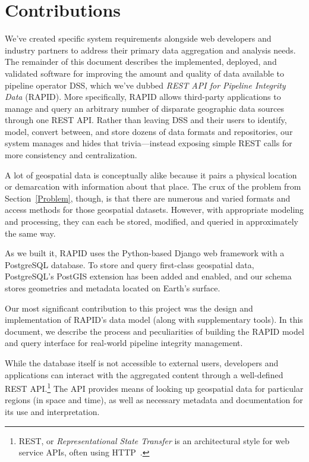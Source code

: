 \section{Contributions}
We've created specific system requirements alongside web developers and industry partners to address their primary data aggregation and analysis needs. The remainder of this document describes the implemented, deployed, and validated software for improving the amount and quality of data available to pipeline operator DSS, which we've dubbed \textit{REST API for Pipeline Integrity Data} (RAPID). More specifically, RAPID allows third-party applications to manage and query an arbitrary number of disparate geographic data sources through one REST API. Rather than leaving DSS and their users to identify, model, convert between, and store dozens of data formats and repositories, our system manages and hides that trivia---instead exposing simple REST calls for more consistency and centralization.

A lot of geospatial data is conceptually alike because it pairs a physical location or demarcation with information about that place. The crux of the problem from Section~\ref{Problem}, though, is that there are numerous and varied formats and access methods for those geospatial datasets. However, with appropriate modeling and processing, they can each be stored, modified, and queried in approximately the same way.

As we built it, RAPID uses the Python-based Django web framework with a PostgreSQL database. To store and query first-class geospatial data, PostgreSQL's PostGIS extension has been added and enabled, and our schema stores geometries and metadata located on Earth's surface.

Our most significant contribution to this project was the design and implementation of RAPID's data model (along with supplementary tools). In this document, we describe the process and peculiarities of building the RAPID model and query interface for real-world pipeline integrity management.

While the database itself is not accessible to external users, developers and applications can interact with the aggregated content through a well-defined REST API.\footnote{REST, or \textit{Representational State Transfer} is an architectural style for web service APIs, often using HTTP~\cite{Francis}.} The API provides means of looking up geospatial data for particular regions (in space and time), as well as necessary metadata and documentation for its use and interpretation.

